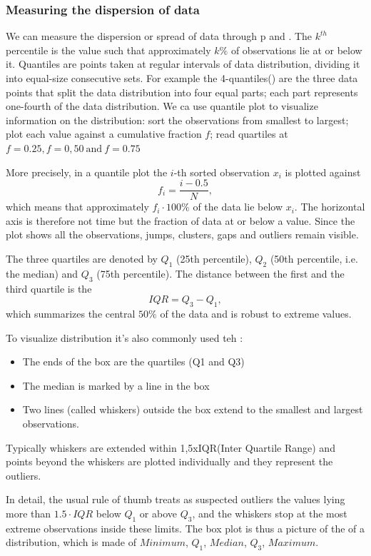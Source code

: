 \subsubsection{Measuring the dispersion of data}
We can measure the dispersion or spread of data through p and . The $k^{th}$ percentile is the value such that approximately $k\%$ of observations lie at or below it. Quantiles are points taken at regular intervals of data distribution, dividing it into equal-size consecutive sets. For example the 4-quantiles() are the three data points that split the data distribution into four equal parts; each part represents one-fourth of the data distribution. We ca use quantile plot to visualize information on the distribution: sort the observations from smallest to largest; plot each value against a cumulative fraction $f$; read quartiles at $f=0.25,f=0,50\  \text{and}\  f=0.75$

More precisely, in a quantile plot the $i$-th sorted observation $x_i$ is plotted against
\[
    f_i=\frac{i-0.5}{N},
\]
which means that approximately $f_i\cdot 100\%$ of the data lie below $x_i$. The horizontal axis is therefore not time but the fraction of data at or below a value. Since the plot shows all the observations, jumps, clusters, gaps and outliers remain visible.

The three quartiles are denoted by $Q_1$ (25th percentile), $Q_2$ (50th percentile, i.e. the median) and $Q_3$ (75th percentile). The distance between the first and the third quartile is the 
\[
    \mathit{IQR}=Q_3-Q_1,
\]
which summarizes the central $50\%$ of the data and is robust to extreme values.

To visualize distribution it's also commonly used teh :
\begin{itemize}
    \item The ends of the box are the quartiles (Q1 and Q3)
    \item The median is marked by a line in the box
    \item Two lines (called whiskers) outside the box extend to the smallest and largest observations.
\end{itemize}

Typically whiskers are extended within 1,5xIQR(Inter Quartile Range) and points beyond the whiskers are plotted individually and they represent the outliers.

In detail, the usual rule of thumb treats as suspected outliers the values lying more than $1.5\cdot\mathit{IQR}$ below $Q_1$ or above $Q_3$, and the whiskers stop at the most extreme observations inside these limits. The box plot is thus a picture of the  of a distribution, which is made of $\mathit{Minimum}$, $Q_1$, $\mathit{Median}$, $Q_3$, $\mathit{Maximum}$.

